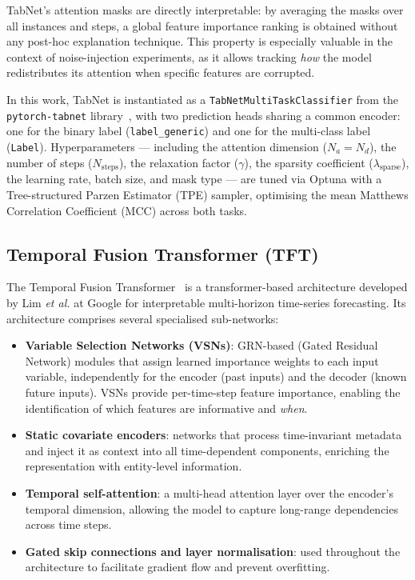 TabNet's attention masks are directly interpretable: by averaging the masks over
all instances and steps, a global feature importance ranking is obtained without
any post-hoc explanation technique.  This property is especially valuable in the
context of noise-injection experiments, as it allows tracking \emph{how} the
model redistributes its attention when specific features are corrupted.

In this work, TabNet is instantiated as a \texttt{TabNetMultiTaskClassifier}
from the \texttt{pytorch-tabnet} library~\cite{dreamquark2020tabnet}, with two
prediction heads sharing a common encoder: one for the binary label
(\texttt{label\_generic}) and one for the multi-class label (\texttt{Label}).
Hyperparameters — including the attention dimension ($N_a = N_d$), the number of
steps ($N_{\text{steps}}$), the relaxation factor ($\gamma$), the sparsity
coefficient ($\lambda_{\text{sparse}}$), the learning rate, batch size, and mask
type — are tuned via Optuna with a Tree-structured Parzen Estimator (TPE)
sampler, optimising the mean Matthews Correlation Coefficient (MCC) across both
tasks.

\subsection{Temporal Fusion Transformer (TFT)}
\label{sec:tech-tft}

The Temporal Fusion Transformer~\cite{lim2021temporal} is a
transformer-based architecture developed by Lim \emph{et al.} at Google for
interpretable multi-horizon time-series forecasting.  Its architecture comprises
several specialised sub-networks:

\begin{itemize}
    \item \textbf{Variable Selection Networks (VSNs)}: GRN-based (Gated
          Residual Network) modules that assign learned importance weights to
          each input variable, independently for the encoder (past inputs) and
          the decoder (known future inputs).  VSNs provide per-time-step
          feature importance, enabling the identification of which features are
          informative and \emph{when}.
    \item \textbf{Static covariate encoders}: networks that process
          time-invariant metadata and inject it as context into all
          time-dependent components, enriching the representation with
          entity-level information.
    \item \textbf{Temporal self-attention}: a multi-head attention layer over
          the encoder's temporal dimension, allowing the model to capture
          long-range dependencies across time steps.
    \item \textbf{Gated skip connections and layer normalisation}: used
          throughout the architecture to facilitate gradient flow and prevent
          overfitting.
\end{itemize}


